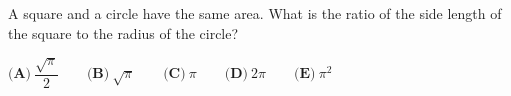 A square and a circle have the same area. What is the ratio of the side length of the square to the radius of the circle?

$\textbf{(A)}\ \dfrac{\sqrt\pi}2\qquad\textbf{(B)}\ \sqrt\pi\qquad\textbf{(C)}\ \pi\qquad\textbf{(D)}\ 2\pi\qquad\textbf{(E)}\ \pi^2$

